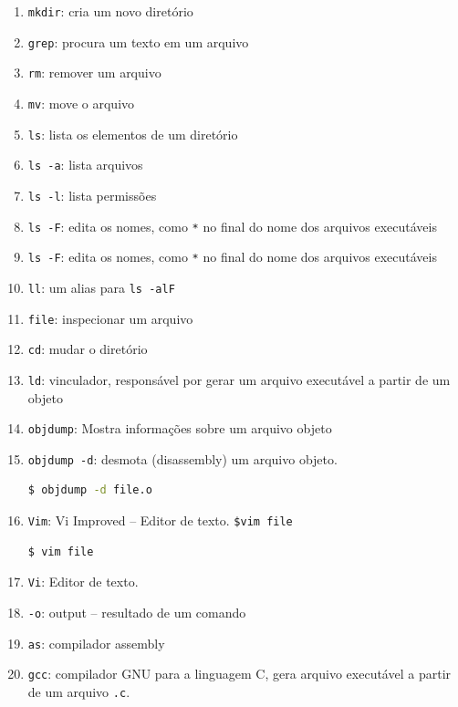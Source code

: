 \begin{enumerate}
\def\labelenumi{\arabic{enumi}.}
\tightlist
\item
  \texttt{mkdir}: cria um novo diretório
\item
  \texttt{grep}: procura um texto em um arquivo
\item
  \texttt{rm}: remover um arquivo
\item
  \texttt{mv}: move o arquivo
\item
  \texttt{ls}: lista os elementos de um diretório
\item
  \texttt{ls\ -a}: lista arquivos
\item
  \texttt{ls\ -l}: lista permissões
\item
  \texttt{ls\ -F}: edita os nomes, como \texttt{*} no final do nome dos
  arquivos executáveis
\item
  \texttt{ls\ -F}: edita os nomes, como \texttt{*} no final do nome dos
  arquivos executáveis
\item
  \texttt{ll}: um alias para \texttt{ls\ -alF}
\item
  \texttt{file}: inspecionar um arquivo
\item
  \texttt{cd}: mudar o diretório
\item
  \texttt{ld}: vinculador, responsável por gerar um arquivo executável a
  partir de um objeto
\item
  \texttt{objdump}: Mostra informações sobre um arquivo objeto
\item
  \texttt{objdump\ -d}: desmota (disassembly) um arquivo objeto.
  
        \begin{lstlisting}[language=bash]
            $ objdump -d file.o
        \end{lstlisting}


\item
  \texttt{Vim}: Vi Improved -- Editor de texto. \texttt{\$vim\ file}
  
        \begin{lstlisting}[language=bash]
            $ vim file
        \end{lstlisting}
\item
  \texttt{Vi}: Editor de texto.
\item
  \texttt{-o}: output -- resultado de um comando
\item
  \texttt{as}: compilador assembly
\item
  \texttt{gcc}: compilador GNU para a linguagem C, gera arquivo
  executável a partir de um arquivo \texttt{.c}.


\end{enumerate}
